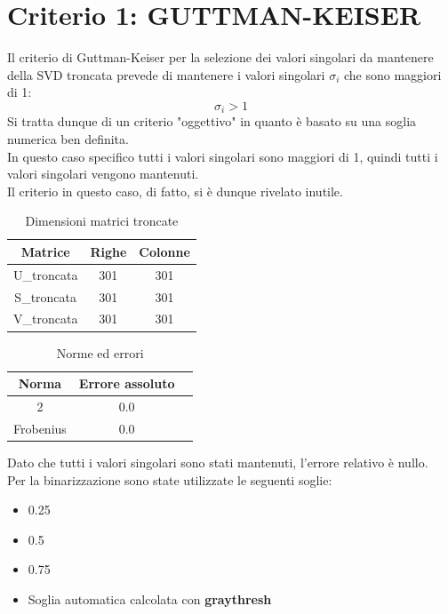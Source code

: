 \section{Criterio 1: GUTTMAN-KEISER}

Il criterio di Guttman-Keiser per la selezione dei valori singolari da mantenere della SVD troncata prevede di mantenere i valori singolari $\sigma_i$ che sono maggiori di 1:
\begin{equation}
    \sigma_i > 1
\end{equation}
Si tratta dunque di un criterio "oggettivo" in quanto è basato su una soglia numerica ben definita.\\
In questo caso specifico tutti i valori singolari sono maggiori di 1, quindi tutti i valori singolari vengono mantenuti.\\
Il criterio in questo caso, di fatto, si è dunque rivelato inutile.


\begin{table}[H]
    \centering
    \begin{tabular}{|c|c|c|}
        \hline
        \textbf{Matrice} & \textbf{Righe} & \textbf{Colonne} \\
        \hline
        U\_troncata & 301 & 301 \\
        \hline
        S\_troncata & 301 & 301 \\
        \hline
        V\_troncata & 301 & 301 \\
        \hline
    \end{tabular}
    \caption{Dimensioni matrici troncate}
\end{table}

\begin{table}[H]
    \centering
    \begin{tabular}{|c|c|c|}
        \hline
        \textbf{Norma} & \textbf{Errore assoluto} \\
        \hline
        2 & 0.0 \\
        \hline
        Frobenius & 0.0 \\
        \hline
    \end{tabular}
    \caption{Norme ed errori}
\end{table}

\noindent Dato che tutti i valori singolari sono stati mantenuti, l'errore relativo è nullo.\\
Per la binarizzazione sono state utilizzate le seguenti soglie:
\begin{itemize}
    \item 0.25
    \item 0.5
    \item 0.75
    \item Soglia automatica calcolata con \textbf{graythresh}
\end{itemize}


